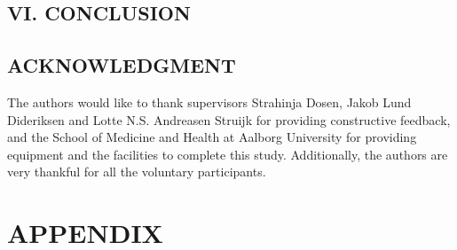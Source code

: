\begin{multicols}{2}
	
	
	\subsection*{VI. CONCLUSION}%
	
	
	
	
	
	\subsection*{ACKNOWLEDGMENT}
	
	The authors would like to thank supervisors Strahinja Dosen, Jakob Lund Dideriksen and Lotte N.S. Andreasen Struijk for providing constructive feedback, and the School of Medicine and Health at Aalborg University for providing equipment and the facilities to complete this study. Additionally, the authors are very thankful for all the voluntary participants. 


\renewcommand*{\bibfont}{\footnotesize}
	\printbibliography
	
	\clearpage
		\section*{APPENDIX}%
		
	
	

\end{multicols}
